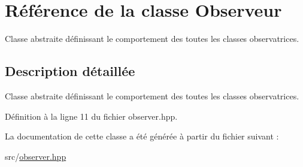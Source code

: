\hypertarget{classObserveur}{\section{Référence de la classe Observeur}
\label{classObserveur}
}


Classe abstraite définissant le comportement des toutes les classes observatrices.  




\subsection{Description détaillée}
Classe abstraite définissant le comportement des toutes les classes observatrices. 

Définition à la ligne 11 du fichier observer.\+hpp.



La documentation de cette classe a été générée à partir du fichier suivant \+:\begin{DoxyCompactItemize}
\item 
src/\hyperlink{observer_8hpp}{observer.\+hpp}\end{DoxyCompactItemize}
